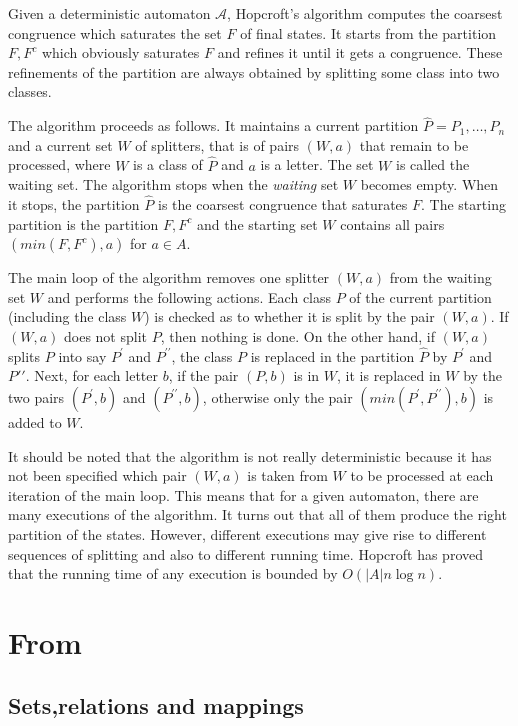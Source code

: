 Given a deterministic automaton $\mathcal{A}$, Hopcroft's algorithm computes the coarsest congruence which saturates the set $F$ of final states. It starts from the partition ${F, F^c}$ which obviously saturates $F$ and refines it until it gets a congruence. These refinements of the
partition are always obtained by splitting some class into two classes.

The algorithm proceeds as follows. It maintains a current partition $\hat{P} = {P_1,\dots,P_n}$ and a current set $W$ of splitters, that is of pairs $(W, a)$ that remain to be processed, where $W$ is a class of $\hat{P}$ and $a$ is a letter. The set $W$ is called the waiting set. The algorithm stops when the \textit{waiting} set $W$ becomes empty. When it stops, the partition $\hat{P}$ is the coarsest congruence that saturates $F$. The starting partition is the partition ${F, F^c}$ and the starting set $W$ contains all pairs $(min(F, F^c), a)$ for $a\in A$.

The main loop of the algorithm removes one splitter $(W, a)$ from the waiting set $W$ and performs the following actions. Each class $P$ of the current partition (including the class $W$) is checked as to whether it is split by the pair $(W, a)$. If $(W, a)$ does not split $P$, then nothing is done. On the other hand, if $(W, a)$ splits $P$ into say $P^\prime$ and $P^{\prime\prime}$, the class $P$ is replaced in the partition $\hat{P}$ by $P^\prime$ and $P\prime\prime$. Next, for each letter $b$, if the pair $(P, b)$ is in $W$, it is replaced in $W$ by the two pairs $(P^\prime, b)$ and $(P^{\prime\prime}, b)$, otherwise only the pair $(min(P^\prime, P^{\prime\prime}), b)$ is added to $W$.

It should be noted that the algorithm is not really deterministic because it has not been specified which pair $(W, a)$ is taken from $W$ to be processed at each iteration of the main loop. This means that for a given automaton, there are many executions of the algorithm. It turns out that all of them produce the right partition of the states. However, different executions may give rise to different sequences of splitting and also to different running time. Hopcroft has proved that the running time of any execution is bounded by $O(|A|n\log n)$.

\section{From \cite{Knuutila2001}}

\subsection{Sets,relations and mappings}

